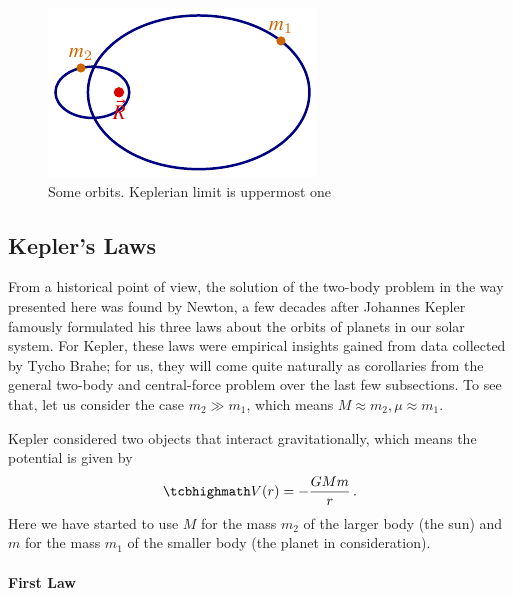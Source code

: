 \documentclass[../class_mech_main.tex]{subfiles}
\begin{document}
\begin{figure}
	\centering

	\includegraphics[height=0.1\textheight]{pictures/central_force_orbits.pdf}

	\caption{Some orbits. Keplerian limit is uppermost one }
	\label{fig:central_force_orbits}
\end{figure}




		\subsection{Kepler's Laws}
From a historical point of view, the solution of the two-body problem in the way presented here was found by Newton, a few decades after Johannes Kepler famously formulated his three laws about the orbits of planets in our solar system. For Kepler, these laws were empirical insights gained from data collected by Tycho Brahe; for us, they will come quite naturally as corollaries from the general two-body and central-force problem over the last few subsections. To see that, let us consider the case $m_2 \gg m_1$, which means $M \approx m_2, \mu \approx m_1$.


Kepler considered two objects that interact gravitationally, which means the potential is given by
\begin{equation}
	\eqbox{
		V(r) = - \frac{G M m}{r}
	}
	\, .
\end{equation}
Here we have started to use $M$ for the mass $m_2$ of the larger body (the sun) and $m$ for the mass $m_1$ of the smaller body (the planet in consideration).







			\paragraph{First Law}
\end{document}
